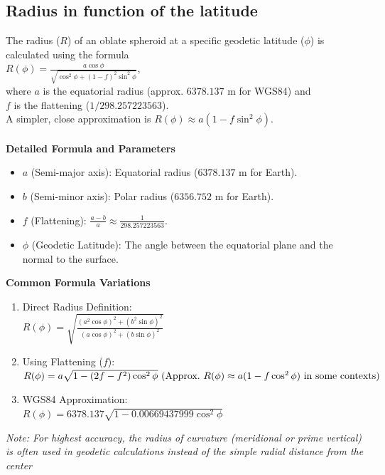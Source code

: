 \documentclass[a4paper,14pt]{article}
\begin{document}
\subsection{Radius in function of the latitude}
The radius (\(R\)) of an oblate spheroid at a specific geodetic latitude (\(\phi \)) is calculated using the formula\\
\(R(\phi )=\frac{a\cos \phi }{\sqrt{\cos ^{2}\phi +(1-f)^{2}\sin ^{2}\phi }}\),\\
where \(a\) is the equatorial radius (approx. \(6378.137\text{\ m}\) for WGS84) and \\
\(f\) is the flattening (\(1/298.257223563\)).\\
A simpler, close approximation is \(R(\phi )\approx a(1-f\sin ^{2}\phi )\).\\ \\
\textbf{Detailed Formula and Parameters}\\
\begin{itemize}
\item \(a\) (Semi-major axis): Equatorial radius (\(6378.137\text{\ m}\) for Earth).\\
\item \(b\) (Semi-minor axis): Polar radius (\(6356.752\text{\ m}\) for Earth).\\
\item \(f\) (Flattening): \(\frac{a-b}{a}\approx \frac{1}{298.257223563}\).\\
\item \(\phi \) (Geodetic Latitude): The angle between the equatorial plane and the normal to the surface.\\
\end{itemize}
\textbf{Common Formula Variations}\\
\begin{enumerate}
\item Direct Radius Definition:\\
\(R(\phi )=\sqrt{\frac{(a^{2}\cos \phi )^{2}+(b^{2}\sin \phi )^{2}}{(a\cos \phi )^{2}+(b\sin \phi )^{2}}}\)\\
\item Using Flattening (\(f\)):\\
\(R(\phi )=a\sqrt{1-(2f-f^{2})\cos ^{2}\phi }\\
\text{\ (Approx.\ }R(\phi )\approx a(1-f\cos ^{2}\phi )\text{\ in\ some\ contexts)}\)\\
\item WGS84 Approximation:\\
\(R(\phi )=6378.137\sqrt{1-0.00669437999\cos ^{2}\phi }\)\\
\end{enumerate}
\textit{Note: For highest accuracy, the radius of curvature (meridional or prime vertical) is often used in geodetic calculations instead of the simple radial distance from the center}\\
\end{document}
